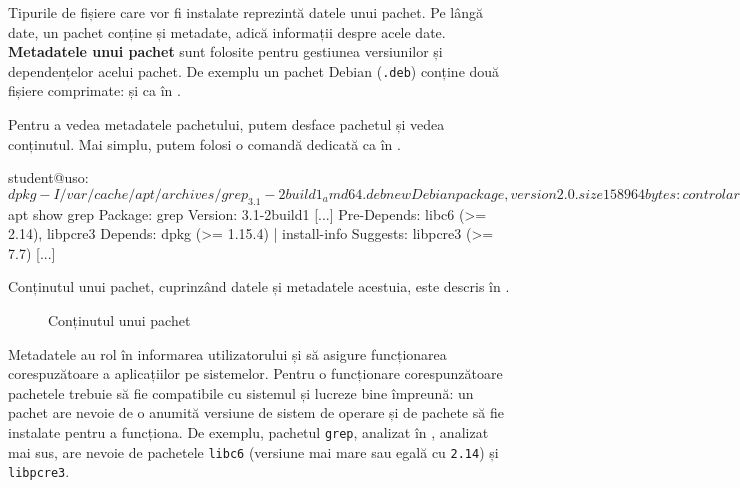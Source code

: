 Tipurile de fișiere care vor fi instalate reprezintă datele unui pachet.
Pe lângă date, un pachet conține și metadate, adică informații despre acele date.
\textbf{Metadatele unui pachet} sunt folosite pentru gestiunea versiunilor și dependențelor acelui pachet.
De exemplu un pachet Debian (\texttt{.deb}) conține două fișiere comprimate:  și  ca în .


Pentru a vedea metadatele pachetului, putem desface pachetul și vedea conținutul.
Mai simplu, putem folosi o comandă dedicată ca în .

\begin{screen}[caption={Metadatele unui pachet Debian (.deb)},label={lst:package:metadata}]
student@uso:~$ dpkg -I /var/cache/apt/archives/grep_3.1-2build1_amd64.deb
 new Debian package, version 2.0.
 size 158964 bytes: control archive=1416 bytes.
    1219 bytes,    29 lines      control
     746 bytes,    13 lines      md5sums
 Package: grep
 Version: 3.1-2build1
 Architecture: amd64
 [...]
 Pre-Depends: libc6 (>= 2.14), libpcre3
 Depends: dpkg (>= 1.15.4) | install-info
 Suggests: libpcre3 (>= 7.7)
 [..]

student@uso:~$ apt show grep
Package: grep
Version: 3.1-2build1
[...]
Pre-Depends: libc6 (>= 2.14), libpcre3
Depends: dpkg (>= 1.15.4) | install-info
Suggests: libpcre3 (>= 7.7)
[...]
\end{screen}

Conținutul unui pachet, cuprinzând datele și metadatele acestuia, este descris în .

\begin{figure}[htbp]
  \centering
  \def\svgwidth{0.8\columnwidth}
  
  \caption{Conținutul unui pachet}
  \label{fig:package:content}
\end{figure}

Metadatele au rol în informarea utilizatorului și să asigure funcționarea corespuzătoare a aplicațiilor pe sistemelor.
Pentru o funcționare corespunzătoare pachetele trebuie să fie compatibile cu sistemul și lucreze bine împreună: un pachet are nevoie de o anumită versiune de sistem de operare și de pachete să fie instalate pentru a funcționa.
De exemplu, pachetul \texttt{grep}, analizat în , analizat mai sus, are nevoie de pachetele \texttt{libc6} (versiune mai mare sau egală cu \texttt{2.14}) și \texttt{libpcre3}.

